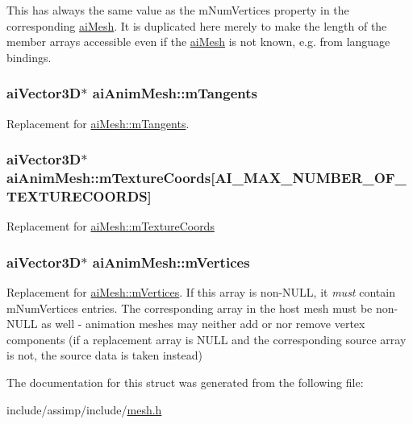 This has always the same value as the m\-Num\-Vertices property in the corresponding \hyperlink{structai_mesh}{ai\-Mesh}. It is duplicated here merely to make the length of the member arrays accessible even if the \hyperlink{structai_mesh}{ai\-Mesh} is not known, e.\-g. from language bindings. \hypertarget{structai_anim_mesh_a95dcc49c6d5ecc570ceb54552a0a9625}{
\subsubsection[{m\-Tangents}]{ {\bf ai\-Vector3\-D}$\ast$ ai\-Anim\-Mesh\-::m\-Tangents}}\label{structai_anim_mesh_a95dcc49c6d5ecc570ceb54552a0a9625}
Replacement for \hyperlink{structai_mesh_af367ff78bd69f3e83d7edc8ad67dc5df}{ai\-Mesh\-::m\-Tangents}. \hypertarget{structai_anim_mesh_ad24a0451adeb845a53eb2351b9462e0a}{
\subsubsection[{m\-Texture\-Coords}]{ {\bf ai\-Vector3\-D}$\ast$ ai\-Anim\-Mesh\-::m\-Texture\-Coords\mbox{[}{\bf A\-I\-\_\-\-M\-A\-X\-\_\-\-N\-U\-M\-B\-E\-R\-\_\-\-O\-F\-\_\-\-T\-E\-X\-T\-U\-R\-E\-C\-O\-O\-R\-D\-S}\mbox{]}}}\label{structai_anim_mesh_ad24a0451adeb845a53eb2351b9462e0a}
Replacement for \hyperlink{structai_mesh_a4a50b11d00ef50f419c75cab0f6bddd6}{ai\-Mesh\-::m\-Texture\-Coords} \hypertarget{structai_anim_mesh_a0ac2dd4c1afd23e6a9293b1d0ded3060}{
\subsubsection[{m\-Vertices}]{ {\bf ai\-Vector3\-D}$\ast$ ai\-Anim\-Mesh\-::m\-Vertices}}\label{structai_anim_mesh_a0ac2dd4c1afd23e6a9293b1d0ded3060}
Replacement for \hyperlink{structai_mesh_afd4588abb3e1c72821ae0234a3850662}{ai\-Mesh\-::m\-Vertices}. If this array is non-\/\-N\-U\-L\-L, it {\itshape must} contain m\-Num\-Vertices entries. The corresponding array in the host mesh must be non-\/\-N\-U\-L\-L as well -\/ animation meshes may neither add or nor remove vertex components (if a replacement array is N\-U\-L\-L and the corresponding source array is not, the source data is taken instead) 

The documentation for this struct was generated from the following file\-:\begin{DoxyCompactItemize}
\item 
include/assimp/include/\hyperlink{mesh_8h}{mesh.\-h}\end{DoxyCompactItemize}
